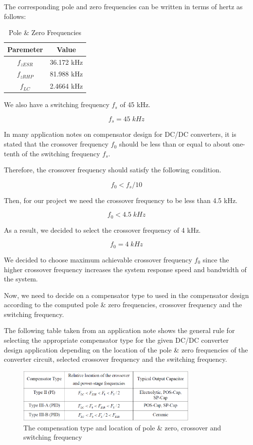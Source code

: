 The corresponding pole and zero frequencies can be written in terms of hertz as follows:

\begin{table}[H]
    \centering
    \caption{Pole \& Zero Frequencies}
    \begin{tabular}{|c|c|}
    \hline
\textbf{Paremeter}   & \textbf{Value}        \\ \hline
$f_{zESR}$ & 36.172 kHz   \\ \hline
$f_{zRHP}$ & 81.988 kHz   \\ \hline
$f_{LC}$ & 2.4664 kHz   \\ \hline
    \end{tabular}
    \label{tab:freq_rad}
\end{table}

We also have a switching frequency $f_s$ of 45 kHz.

$$ f_s = 45\; kHz $$

In many application notes on compensator design for DC/DC converters, it is stated that the crossover frequency $f_0$ should be less than or equal to about one-tenth of the switching frequency $f_s$.

Therefore, the crossover frequency should satisfy the following condition.

$$ f_0 < f_s/10 $$

Then, for our project we need the crossover frequency to be less than 4.5 kHz.

$$ f_0 < 4.5\; kHz $$

As a result, we decided to select the crossover frequency of 4 kHz.

$$ f_0 = 4\; kHz $$

We decided to choose maximum achievable crossover frequency $f_0$ since the higher crossover frequency increases the system response speed and bandwidth of the system.

Now, we need to decide on a compensator type to used in the compensator design according to the computed pole \& zero frequencies, crossover frequency and the switching frequency.

The following table taken from an application note shows the general rule for selecting the appropriate compensator type for the given DC/DC converter design application depending on the location of the pole \& zero frequencies of the converter circuit, selected crossover frequency and the switching frequency.

\begin{figure}[H]
\begin{center}
\includegraphics[width=0.8\textwidth]{Compensator/comp_type.png}
\caption{The compensation type and location of pole \& zero, crossover and switching frequency}
\label{com:comp_type}
\end{center}
\end{figure}


